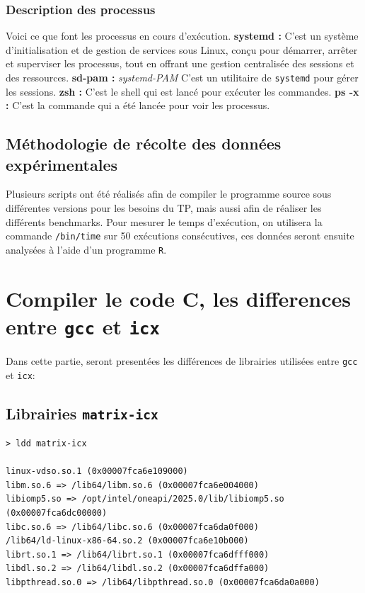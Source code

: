 \documentclass{rapport}
\begin{document}
    \subsubsection*{Description des processus}
    Voici ce que font les processus en cours d'exécution.
    \newline\newline
    \textbf{systemd :} C'est un système d'initialisation et de gestion de services sous Linux, conçu pour démarrer, arrêter et superviser les processus, tout en offrant une gestion centralisée des sessions et des ressources.
    \newline
    \textbf{sd-pam :} \textit{systemd-PAM} C'est un utilitaire de \texttt{systemd} pour gérer les sessions.
    \newline
    \textbf{zsh :} C'est le shell qui est lancé pour exécuter les commandes.
    \newline
    \textbf{ps -x :} C'est la commande qui a été lancée pour voir les processus.
    
    \subsection*{Méthodologie de récolte des données expérimentales}
    
    Plusieurs scripts ont été réalisés afin de compiler le programme source sous différentes versions pour les besoins du TP, mais aussi afin de réaliser les différents benchmarks.
    \newline Pour mesurer le temps d'exécution, on utilisera la commande \texttt{/bin/time} sur 50 exécutions consécutives, ces données seront ensuite analysées à l'aide d'un programme \texttt{R}.

\section{Compiler le code C, les differences entre \texttt{gcc} et \texttt{icx}}
Dans cette partie, seront presentées les différences de librairies utilisées entre \texttt{gcc} et \texttt{icx}:
\subsection*{Librairies \texttt{matrix-icx}}
\begin{lstlisting}
> ldd matrix-icx

linux-vdso.so.1 (0x00007fca6e109000)
libm.so.6 => /lib64/libm.so.6 (0x00007fca6e004000)
libiomp5.so => /opt/intel/oneapi/2025.0/lib/libiomp5.so (0x00007fca6dc00000)
libc.so.6 => /lib64/libc.so.6 (0x00007fca6da0f000)
/lib64/ld-linux-x86-64.so.2 (0x00007fca6e10b000)
librt.so.1 => /lib64/librt.so.1 (0x00007fca6dfff000)
libdl.so.2 => /lib64/libdl.so.2 (0x00007fca6dffa000)
libpthread.so.0 => /lib64/libpthread.so.0 (0x00007fca6da0a000)
\end{lstlisting}
\end{document}
